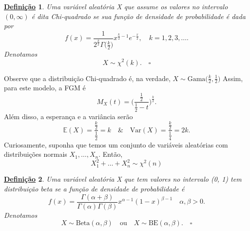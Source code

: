 \documentclass{article}
\newtheorem*{def*}{\underline{Defini\c c\~ao}}
\begin{document}
\begin{def*}
  Uma variável aleatória X que assume os valores no intervalo \((0, \infty)\) é dita \textit{Chi-quadrado} se sua função de densidade de probabilidade é dada por 
  \[
    f(x) = \frac{1}{2^{\frac{k}{2}}\Gamma \biggl(\frac{k}{2}\biggr)}x^{\frac{k}{2}-1}e^{-\frac{x}{2}},\quad k = 1, 2, 3, \dotsc.
  \]
  Denotamos 
  \[
    X\sim \chi^{2}(k). \quad \square
  \]
\end{def*}
  Observe que a distribuição Chi-quadrado é, na verdade, \(X\sim \mathrm{Gama}\biggl(\frac{k}{2}, \frac{1}{2}\biggr)\)
Assim, para este modelo, a FGM é 
  \[
    M_{X}(t) = \biggl(\frac{\frac{1}{2}}{\frac{1}{2}-t}\biggr)^{\frac{k}{2}}.
  \]
  Além disso, a esperança e a variância serão 
  \[
    \mathbb{E}(X) = \frac{\frac{k}{2}}{\frac{1}{2}} = k \quad\&\quad \mathrm{Var}(X) = \frac{\frac{k}{2}}{\frac{1}{4}} = 2k.
  \]
  Curiosamente, suponha que temos um conjunto de variáveis aleatórias com distribuições normais \(X_{1}, \dotsc , X_{n}\). Então, 
  \[
    X_{1}^{2} + \dotsc + X_{n}^{2}\sim \chi^{2}(n) 
  \]
\begin{def*}
  Uma variável aleatória X que tem valores no intervalo (0, 1) tem distribuição beta se a função de densidade de probabilidade é 
  \[
    f(x) = \frac{\Gamma (\alpha +\beta )}{\Gamma (\alpha )\Gamma (\beta )}x^{\alpha -1}(1-x)^{\beta -1}\quad \alpha , \beta > 0.
  \]
  Denotamos 
  \[
    X\sim \mathrm{Beta}(\alpha , \beta )\quad \text{ou}\quad X\sim \mathrm{BE}(\alpha , \beta ). \quad \square
  \]
\end{def*}
\end{document}
